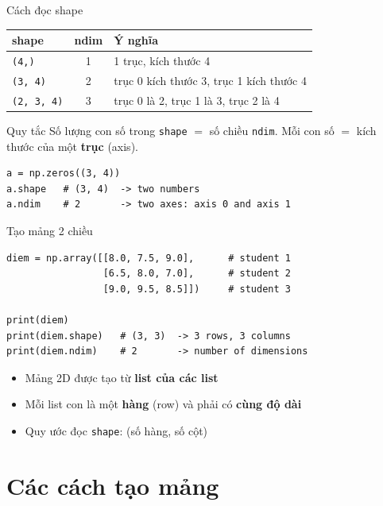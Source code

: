 \documentclass[11pt]{beamer}
\begin{document}
\begin{frame}[fragile]{Cách đọc shape}
\begin{center}
\small
\begin{tabular}{|l|c|l|}
\hline
\textbf{shape} & \textbf{ndim} & \textbf{Ý nghĩa} \\
\hline
\texttt{(4,)}      & 1 & 1 trục, kích thước 4 \\
\texttt{(3, 4)}    & 2 & trục 0 kích thước 3, trục 1 kích thước 4 \\
\texttt{(2, 3, 4)} & 3 & trục 0 là 2, trục 1 là 3, trục 2 là 4 \\
\hline
\end{tabular}
\end{center}
\begin{block}{Quy tắc}
Số lượng con số trong \texttt{shape} $=$ số chiều \texttt{ndim}.
Mỗi con số $=$ kích thước của một \textbf{trục} (axis).
\end{block}
\begin{lstlisting}
a = np.zeros((3, 4))
a.shape   # (3, 4)  -> two numbers
a.ndim    # 2       -> two axes: axis 0 and axis 1
\end{lstlisting}
\end{frame}

\begin{frame}[fragile]{Tạo mảng 2 chiều}
\begin{lstlisting}
diem = np.array([[8.0, 7.5, 9.0],      # student 1
                 [6.5, 8.0, 7.0],      # student 2
                 [9.0, 9.5, 8.5]])     # student 3

print(diem)
print(diem.shape)   # (3, 3)  -> 3 rows, 3 columns
print(diem.ndim)    # 2       -> number of dimensions
\end{lstlisting}
\begin{itemize}
  \item Mảng 2D được tạo từ \textbf{list của các list}
  \item Mỗi list con là một \textbf{hàng} (row) và phải có \textbf{cùng độ dài}
  \item Quy ước đọc \texttt{shape}: (số hàng, số cột)
\end{itemize}
\end{frame}

\section{Các cách tạo mảng}
\end{document}
